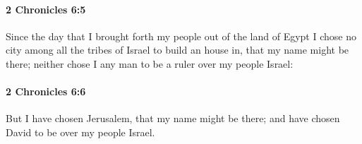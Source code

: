 		\paragraph{2 Chronicles 6:5} %
			\label{2CHRONICLES-6-5}

			Since the day that I brought forth my people out of the land of Egypt I chose no city among all the tribes of Israel to build an house in, that my name might be there; neither chose I any man to be a ruler over my people Israel:


		\paragraph{2 Chronicles 6:6} %
			\label{2CHRONICLES-6-6}

			But I have chosen Jerusalem, that my name might be there; and have chosen David to be over my people Israel.


